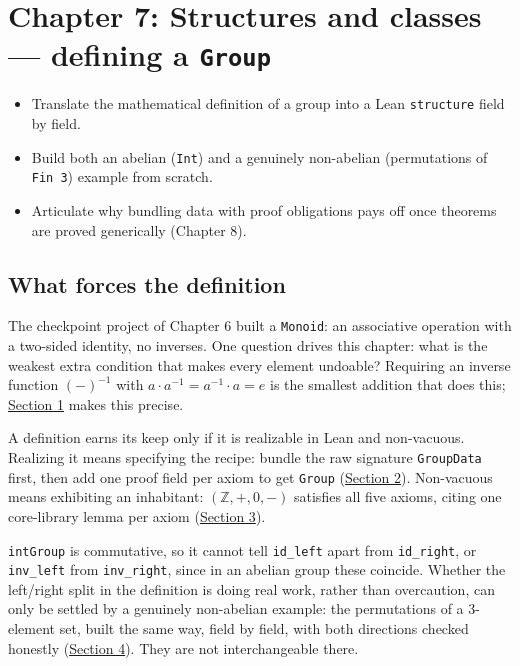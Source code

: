 \chapter{\texorpdfstring{Chapter 7: Structures and classes --- defining a \texttt{Group}}{Chapter 7: Structures and classes --- defining a Group}}\label{sec:07-groups:00-index:1}

\begin{learningobjectives}
\begin{itemize}
\tightlist
\item
  Translate the mathematical definition of a group into a Lean \texttt{structure} field by field.
\item
  Build both an abelian (\texttt{Int}) and a genuinely non-abelian (permutations of \texttt{Fin 3}) example from scratch.
\item
  Articulate why bundling data with proof obligations pays off once theorems are proved generically (Chapter 8).
\end{itemize}
\end{learningobjectives}


\section*{What forces the definition}\label{sec:07-groups:00-index:2}

The checkpoint project of Chapter 6 built a \texttt{Monoid}: an associative operation with a two-sided identity, no inverses. One question drives this chapter: what is the weakest extra condition that makes every element undoable? Requiring an inverse function \((-)^{-1}\) with \(a \cdot a^{-1} =
a^{-1} \cdot a = e\) is the smallest addition that does this; \hyperref[sec:07-groups:01-definition:1]{Section 1} makes this precise.

A definition earns its keep only if it is realizable in Lean and non-vacuous. Realizing it means specifying the recipe: bundle the raw signature \texttt{GroupData} first, then add one proof field per axiom to get \texttt{Group} (\hyperref[sec:07-groups:02-translating:1]{Section 2}). Non-vacuous means exhibiting an inhabitant: \((\mathbb{Z}, +, 0, -)\) satisfies all five axioms, citing one core-library lemma per axiom (\hyperref[sec:07-groups:03-integers-example:1]{Section 3}).

\texttt{intGroup} is commutative, so it cannot tell \texttt{id\_\allowbreak{}left} apart from \texttt{id\_\allowbreak{}right}, or \texttt{inv\_\allowbreak{}left} from \texttt{inv\_\allowbreak{}right}, since in an abelian group these coincide. Whether the left/right split in the definition is doing real work, rather than overcaution, can only be settled by a genuinely non-abelian example: the permutations of a 3-element set, built the same way, field by field, with both directions checked honestly (\hyperref[sec:07-groups:04-permutations-example:1]{Section 4}). They are not interchangeable there.

